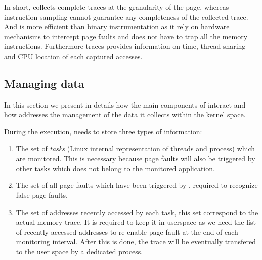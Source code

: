 In short, \Moca collects complete traces at the granularity of the page, whereas instruction
sampling cannot guarantee any completeness of the collected trace. And \Moca is 
more efficient than binary instrumentation as it rely on hardware mechanisms
to intercept page faults and does not have to trap all the memory instructions.
Furthermore \Moca traces provides information on time, thread sharing and CPU
location of each captured accesses.


\subsection{Managing data}
\label{sec:design-tech}

In this section we present in details how the main components of \Moca
interact and how \Moca addresses the management of the data it collects
within the kernel space.

During the execution, \Moca needs to store three types of information:
\begin{enumerate}
    \item The set of \emph{tasks} (Linux internal representation of threads and process) which are
monitored. This is necessary because page faults will also be triggered by other tasks which does not belong to
the monitored application.
    \item The set of all page faults which have been triggered by \Moca,
        required to recognize false page faults.
    \item The set of addresses recently accessed by each task, this set
        correspond to the actual memory trace. It is required to keep it in
        userspace as we need the list of recently accessed addresses to
        re-enable page fault at the end of each monitoring interval. After
        this is done, the trace will be eventually transfered to
        the user space by a dedicated process.
\end{enumerate}

